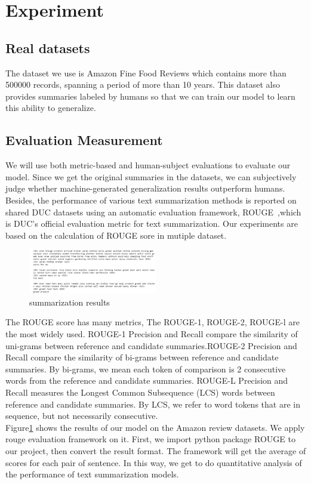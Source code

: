 \documentclass[conference]{IEEEtran}
\begin{document}
\section{Experiment}
\subsection{Real datasets}
The dataset we use is Amazon Fine Food Reviews which contains more than 500000 records, spanning a period of more than 10 years. This dataset also provides summaries labeled by humans so that we can train our model to learn this ability to generalize. 
\subsection{Evaluation Measurement}
We will use both metric-based and human-subject evaluations to evaluate our model. Since we get the original summaries in the datasets, we can subjectively judge whether machine-generated generalization results outperform humans.  Besides, the performance of various text summarization methods is reported on shared DUC datasets using an automatic evaluation framework, ROUGE~\cite{lin-2004-rouge},which is DUC’s official evaluation metric for text summarization. Our experiments are based on the calculation of ROUGE sore in mutiple dataset.

\begin{figure}[h]
\centering
\includegraphics[width=0.5\textwidth]{imgs/Results.png}
\caption{summarization results}
\label{fig:Results}
\end{figure}
The ROUGE score has many metrics, The ROUGE-1, ROUGE-2, ROUGE-l are the most widely used. ROUGE-1 Precision and Recall compare the similarity of uni-grams between reference and candidate summaries.ROUGE-2 Precision and Recall compare the similarity of bi-grams between reference and candidate summaries. By bi-grams, we mean each token of comparison is 2 consecutive words from the reference and candidate summaries. ROUGE-L Precision and Recall measures the Longest Common Subsequence (LCS) words between reference and candidate summaries. By LCS, we refer to word tokens that are in sequence, but not necessarily consecutive. \\
Figure\ref{fig:Results} shows the results of our model on the Amazon review datasets. We apply rouge evaluation framework on it. First, we import python package ROUGE to our project, then convert the result format. The framework will get the average of scores for each pair of sentence. In this way, we get to do quantitative analysis of the performance of text summarization models.
\end{document}
